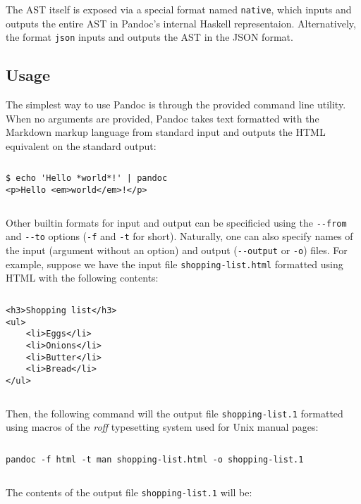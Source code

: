 \documentclass[
  digital,     %
  oneside,     %
  nosansbold,  %
  nocolorbold, %
  lof,         %
  lot,         %
]{fithesis4}
\begin{document}
The AST itself is exposed via a special format named \texttt{native}, which inputs and outputs the entire AST in Pandoc's internal Haskell representaion. Alternatively, the format \texttt{json} inputs and outputs the AST in the JSON format.

\subsection{Usage}

The simplest way to use Pandoc is through the provided command line utility. When no arguments are provided, Pandoc takes text formatted with the Markdown markup language from standard input and outputs the HTML equivalent on the standard output:

$ $

\noindent
\begin{lstlisting}
$ echo 'Hello *world*!' | pandoc
<p>Hello <em>world</em>!</p>
\end{lstlisting}

$ $

Other builtin formats for input and output can be specificied using the \texttt{-{}-from} and \texttt{-{}-to} options (\texttt{-f} and \texttt{-t} for short). Naturally, one can also specify names of the input (argument without an option) and output (\texttt{-{}-output} or \texttt{-o}) files. For example, suppose we have the input file \texttt{shopping-list.html} formatted using HTML with the following contents:

$ $

\noindent
\lstset{language=HTML}
\begin{lstlisting}
<h3>Shopping list</h3>
<ul>
    <li>Eggs</li>
    <li>Onions</li>
    <li>Butter</li>
    <li>Bread</li>
</ul>
\end{lstlisting}

$ $

\noindent
Then, the following command will the output file \texttt{shopping-list.1} formatted using macros of the \textit{roff} typesetting system used for Unix manual pages:

$ $

\noindent
\lstset{language=}
\begin{lstlisting}
pandoc -f html -t man shopping-list.html -o shopping-list.1
\end{lstlisting}

$ $

\noindent
The contents of the output file \texttt{shopping-list.1} will be:
\end{document}
